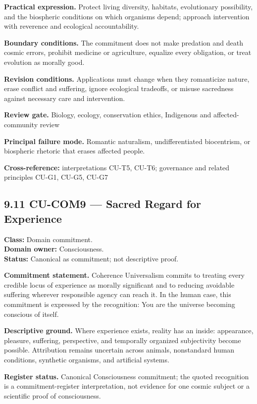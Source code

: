 \documentclass[
  11pt,
]{article}
\begin{document}
\textbf{Practical expression.} Protect living diversity, habitats,
evolutionary possibility, and the biospheric conditions on which
organisms depend; approach intervention with reverence and ecological
accountability.

\textbf{Boundary conditions.} The commitment does not make predation and
death cosmic errors, prohibit medicine or agriculture, equalize every
obligation, or treat evolution as morally good.

\textbf{Revision conditions.} Applications must change when they
romanticize nature, erase conflict and suffering, ignore ecological
tradeoffs, or misuse sacredness against necessary care and intervention.

\textbf{Review gate.} Biology, ecology, conservation ethics, Indigenous
and affected-community review

\textbf{Principal failure mode.} Romantic naturalism, undifferentiated
biocentrism, or biospheric rhetoric that erases affected people.

\textbf{Cross-reference:} interpretations CU-T5, CU-T6; governance and
related principles CU-G1, CU-G5, CU-G7

\subsection{9.11 CU-COM9 --- Sacred Regard for
Experience}\label{cu-com9-sacred-regard-for-experience}

\textbf{Class:} Domain commitment.\\
\textbf{Domain owner:} Consciousness.\\
\textbf{Status:} Canonical as commitment; not descriptive proof.

\textbf{Commitment statement.} Coherence Universalism commits to
treating every credible locus of experience as morally significant and
to reducing avoidable suffering wherever responsible agency can reach
it. In the human case, this commitment is expressed by the recognition:
You are the universe becoming conscious of itself.

\textbf{Descriptive ground.} Where experience exists, reality has an
inside: appearance, pleasure, suffering, perspective, and temporally
organized subjectivity become possible. Attribution remains uncertain
across animals, nonstandard human conditions, synthetic organisms, and
artificial systems.

\textbf{Register status.} Canonical Consciousness commitment; the quoted
recognition is a commitment-register interpretation, not evidence for
one cosmic subject or a scientific proof of consciousness.
\end{document}
